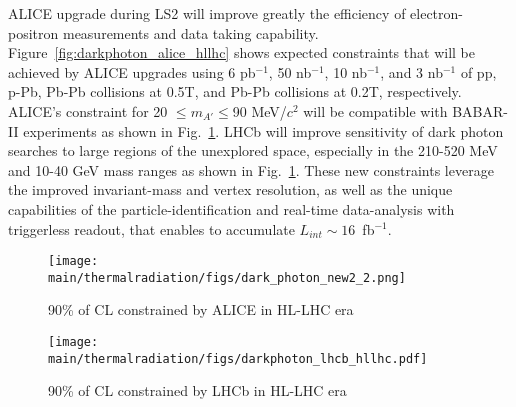 \documentclass[../report.tex]{subfiles}
\providecommand{\main}{..}
\begin{document}
ALICE upgrade during LS2 will improve greatly 
the efficiency of electron-positron measurements and data taking capability.
Figure~\ref{fig:darkphoton_alice_hllhc} shows 
expected constraints that will be achieved by ALICE upgrades 
using 6 pb$^{-1}$, 50 nb$^{-1}$, 10 nb$^{-1}$, and 3 nb$^{-1}$
of pp, p-Pb, Pb-Pb collisions at 0.5T, and Pb-Pb collisions at 0.2T, 
respectively. ALICE's constraint for 20 $\le m_{A'} \le $90 MeV/$c^2$ 
will be compatible with BABAR-II experiments as shown in Fig.~\ref{fig:darkphoton_lhcb_hllhc}.
LHCb will improve sensitivity of dark photon searches to large regions 
of the unexplored space, especially in the 210-520 MeV and 10-40 GeV mass ranges
as shown in Fig.~\ref{fig:darkphoton_lhcb_hllhc}. 
These new constraints leverage the improved invariant-mass and vertex resolution, 
as well as the unique capabilities of the particle-identification and real-time 
data-analysis with triggerless readout, that enables to accumulate $L_{int} \sim 16$~fb$^{-1}$.

\begin{figure}[htbp]
 \begin{minipage}{0.5\hsize}
  \begin{center}
   \texttt{[image: \\main/thermalradiation/figs/dark\_photon\_new2\_2.png]}
  \end{center}
  \caption{90\% of CL constrained by ALICE in HL-LHC era}
  \label{fig:darkphoton_alice_hllhc}
 \end{minipage}
 \begin{minipage}{0.5\hsize}
  \begin{center}
   \texttt{[image: \\main/thermalradiation/figs/darkphoton\_lhcb\_hllhc.pdf]}
  \end{center}
  \caption{90\% of CL constrained by LHCb in HL-LHC era}
  \label{fig:darkphoton_lhcb_hllhc}
 \end{minipage}
\end{figure}


\end{document}
